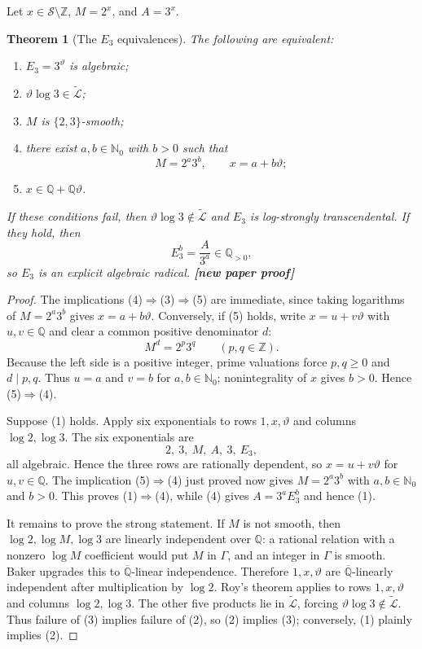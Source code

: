 \documentclass[11pt,oneside]{article}
\newtheorem{theorem}{Theorem}[section]
\theoremstyle{definition}
\theoremstyle{remark}
\newcommand{\Nzero}{\mathbb N_0}
\newcommand{\Z}{\mathbb Z}
\newcommand{\Q}{\mathbb Q}
\newcommand{\Qbar}{\overline{\mathbb Q}}
\newcommand{\Sol}{\mathcal S}
\newcommand{\LL}{\widetilde{\mathcal L}}
\newcommand{\statusnew}{\textcolor{NewViolet}{\textbf{[new paper proof]}}}
\begin{document}
Let $x\in\Sol\setminus\Z$, $M=2^x$, and $A=3^x$.

\begin{theorem}[The $E_3$ equivalences]\label{thm:E3}
The following are equivalent:
\begin{enumerate}
\item $E_3=3^{\vartheta}$ is algebraic;
\item $\vartheta\log3\in\LL$;
\item $M$ is $\{2,3\}$-smooth;
\item there exist $a,b\in\Nzero$ with $b>0$ such that
      \[
        M=2^a3^b,
        \qquad x=a+b\vartheta;
      \]
\item $x\in\Q+\Q\vartheta$.
\end{enumerate}
If these conditions fail, then $\vartheta\log3\notin\LL$ and $E_3$ is log-strongly
transcendental.  If they hold, then
\[
  E_3^b=\frac{A}{3^a}\in\Q_{>0},
\]
so $E_3$ is an explicit algebraic radical.  \statusnew
\end{theorem}

\begin{proof}
The implications (4)$\Rightarrow$(3)$\Rightarrow$(5) are immediate, since taking logarithms
of $M=2^a3^b$ gives $x=a+b\vartheta$.  Conversely, if (5) holds, write
$x=u+v\vartheta$ with $u,v\in\Q$ and clear a common positive denominator $d$:
\[
  M^d=2^p3^q
  \qquad(p,q\in\Z).
\]
Because the left side is a positive integer, prime valuations force $p,q\ge0$ and
$d\mid p,q$.  Thus $u=a$ and $v=b$ for $a,b\in\Nzero$; nonintegrality of $x$ gives
$b>0$.  Hence (5)$\Rightarrow$(4).

Suppose (1) holds.  Apply six exponentials to rows $1,x,\vartheta$ and columns
$\log2,\log3$.  The six exponentials are
\[
  2,\ 3,\ M,\ A,\ 3,\ E_3,
\]
all algebraic.  Hence the three rows are rationally dependent, so
$x=u+v\vartheta$ for $u,v\in\Q$.  The implication (5)$\Rightarrow$(4) just proved now gives
$M=2^a3^b$ with $a,b\in\Nzero$ and $b>0$.  This proves (1)$\Rightarrow$(4), while (4) gives
$A=3^aE_3^b$ and hence (1).

It remains to prove the strong statement.  If $M$ is not smooth, then
$\log2,\log M,\log3$ are linearly independent over $\Q$: a rational relation with a nonzero
$\log M$ coefficient would put $M$ in $\Gamma$, and an integer in $\Gamma$ is smooth.  Baker
upgrades this to $\Qbar$-linear independence.  Therefore $1,x,\vartheta$ are
$\Qbar$-linearly independent after multiplication by $\log2$.  Roy's theorem applies to
rows $1,x,\vartheta$ and columns $\log2,\log3$.  The other five products lie in $\LL$, forcing
$\vartheta\log3\notin\LL$.  Thus failure of (3) implies failure of (2), so (2) implies
(3); conversely, (1) plainly implies (2).
\end{proof}
\end{document}
